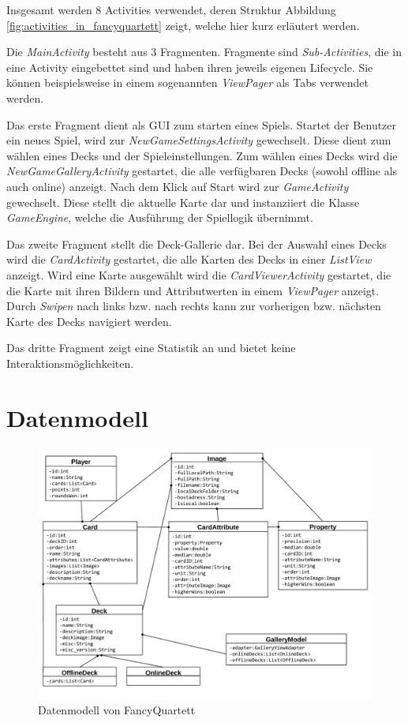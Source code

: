 Insgesamt werden 8 Activities verwendet, deren Struktur Abbildung \ref{fig:activities_in_fancyquartett} zeigt, welche hier kurz erläutert werden.

Die \emph{MainActivity} besteht aus 3 Fragmenten. Fragmente sind \emph{Sub-Activities}, die in eine Activity eingebettet sind und haben ihren jeweils eigenen Lifecycle. Sie können beispielsweise in einem sogenannten \emph{ViewPager} als Tabs verwendet werden.

Das erste Fragment dient als GUI zum starten eines Spiels. Startet der Benutzer ein neues Spiel, wird zur \emph{NewGameSettingsActivity} gewechselt. Diese dient zum wählen eines Decks und der Spieleinstellungen. Zum wählen eines Decks wird die \emph{NewGameGalleryActivity} gestartet, die alle verfügbaren Decks (sowohl offline als auch online) anzeigt. Nach dem Klick auf Start wird zur \emph{GameActivity} gewechselt. Diese stellt die aktuelle Karte dar und instanziiert die Klasse \emph{GameEngine}, welche die Ausführung der Spiellogik übernimmt.

Das zweite Fragment stellt die Deck-Gallerie dar. Bei der Auswahl eines Decks wird die \emph{CardActivity} gestartet, die alle Karten des Decks in einer \emph{ListView} anzeigt. Wird eine Karte ausgewählt wird die \emph{CardViewerActivity} gestartet, die die Karte mit ihren Bildern und Attributwerten in einem \emph{ViewPager} anzeigt. Durch \emph{Swipen} nach links bzw. nach rechts kann zur vorherigen bzw. nächsten Karte des Decks navigiert werden.

Das dritte Fragment zeigt eine Statistik an und bietet keine Interaktionsmöglichkeiten.

\section{Datenmodell}
\label{sec:datenmodell}

\begin{figure}[ht]
    \centering
    \includegraphics[width=\textwidth]{../img/Datenmodell.pdf}
    \caption{Datenmodell von FancyQuartett}
    \label{fig:datenmodell}
\end{figure}


